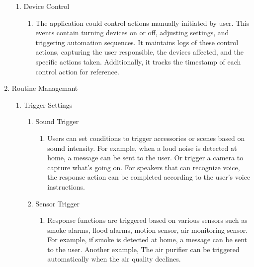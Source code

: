\documentclass[11pt, conference]{IEEEtran}
\begin{document}
\begin{enumerate}[label=\arabic*.]
\begin{enumerate}[label=\arabic*.]
        \item {\large{Device Control}}\\
        \begin{enumerate}[label*={\arabic*.},ref=\theenumi.\arabic*]
        \setlength{\itemindent}{0.5cm}
            \item The application could control actions manually initiated by user. This events contain turning devices on or off, adjusting settings, and triggering automation sequences. It maintains logs of these control actions, capturing the user responsible, the devices affected, and the specific actions taken. Additionally, it tracks the timestamp of each control action for reference.\\
        \end{enumerate}
    \end{enumerate}

    \item {\large{Routine Managemant}}\\
    \begin{enumerate}[label*={\arabic*.}]
        \item {\large{Trigger Settings}}\\
            \begin{enumerate}[label*={\alph*.},ref=\theenumi.\arabic*]
            \setlength{\itemindent}{0.5cm}
                \item {\large{Sound Trigger}}\\
                \begin{enumerate}[label*={\arabic*.},ref=\theenumi.\arabic*]
                \setlength{\itemindent}{0.5cm}
                    \item Users can set conditions to trigger accessories or scenes based on sound intensity. For example, when a loud noise is detected at home, a message can be sent to the user. Or trigger a camera to capture what's going on. For speakers that can recognize voice, the response action can be completed according to the user's voice instructions.\\
                \end{enumerate}
                
                \item {\large{Sensor Trigger}}\\
                \begin{enumerate}[label*={\arabic*.},ref=\theenumi.\arabic*]
                \setlength{\itemindent}{0.5cm}
                    \item Response functions are triggered based on various sensors such as smoke alarms, flood alarms, motion sensor, air monitoring sensor. For example, if smoke is detected at home, a message can be sent to the user. Another example, The air purifier can be triggered automatically when the air quality declines.\\
                \end{enumerate}
                

\end{enumerate}
\end{enumerate}
\end{enumerate}
\end{document}

